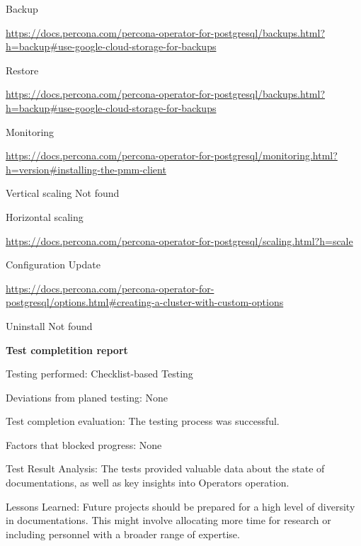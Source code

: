 Backup

\url{https://docs.percona.com/percona-operator-for-postgresql/backups.html?h=backup#use-google-cloud-storage-for-backups}

Restore

\url{https://docs.percona.com/percona-operator-for-postgresql/backups.html?h=backup#use-google-cloud-storage-for-backups}

Monitoring

\url{https://docs.percona.com/percona-operator-for-postgresql/monitoring.html?h=version#installing-the-pmm-client}

Vertical scaling
Not found

Horizontal scaling

\url{https://docs.percona.com/percona-operator-for-postgresql/scaling.html?h=scale}

Configuration Update

\url{https://docs.percona.com/percona-operator-for-postgresql/options.html#creating-a-cluster-with-custom-options}

Uninstall
Not found

\textbf{Test completition report}

Testing performed: Checklist-based Testing

Deviations from planed testing: None

Test completion evaluation: The testing process was successful.

Factors that blocked progress: None

Test Result Analysis: The tests provided valuable data about the state of documentations, as well as key insights into Operators operation.

Lessons Learned: Future projects should be prepared for a high level of diversity in documentations. This might involve allocating more time for research or including personnel with a broader range of expertise.



